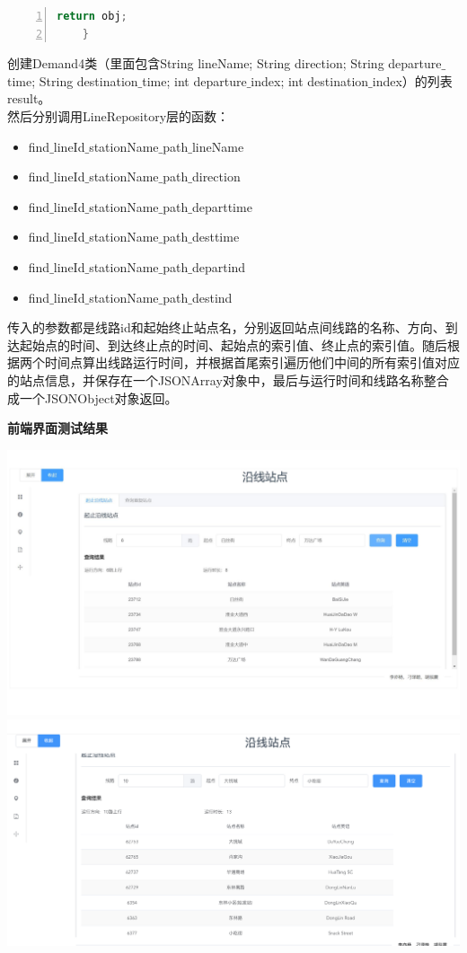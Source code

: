 \documentclass[11pt,a4paper]{article}
\begin{document}
\begin{lstlisting}[numbers = left, 
showstringspaces=false,
showspaces = false,
breaklines = true, 
language=Java]
        return obj;
    }
\end{lstlisting} 
创建Demand4类（里面包含String lineName; String direction; String departure$\_$time; String destination$\_$time; int departure$\_$index; int destination$\_$index）的列表result。\\
然后分别调用LineRepository层的函数：
\begin{itemize}
\item find$\_$lineId$\_$stationName$\_$path$\_$lineName
\item find$\_$lineId$\_$stationName$\_$path$\_$direction
\item find$\_$lineId$\_$stationName$\_$path$\_$departtime
\item find$\_$lineId$\_$stationName$\_$path$\_$desttime
\item find$\_$lineId$\_$stationName$\_$path$\_$departind
\item find$\_$lineId$\_$stationName$\_$path$\_$destind 
\end{itemize}
传入的参数都是线路id和起始终止站点名，分别返回站点间线路的名称、方向、到达起始点的时间、到达终止点的时间、起始点的索引值、终止点的索引值。随后根据两个时间点算出线路运行时间，并根据首尾索引遍历他们中间的所有索引值对应的站点信息，并保存在一个JSONArray对象中，最后与运行时间和线路名称整合成一个JSONObject对象返回。

\textbf{前端界面测试结果} \\
\begin{center}
\centering
\includegraphics[scale=0.3]{./assets/demand4_1.jpg} \\ 
\includegraphics[scale=0.3]{./assets/demand4_2.png} 
\end{center}
\end{document}
